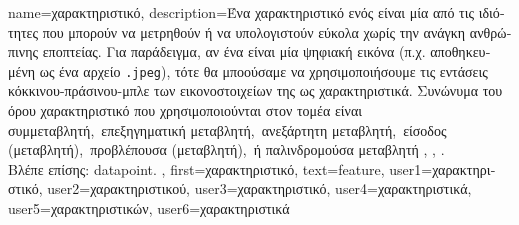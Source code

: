 {name={\foreignlanguage{greek}{χαρακτηριστικό}},
	description={\foreignlanguage{greek}{Ένα χαρακτηριστικό ενός} 
		 \foreignlanguage{greek}{είναι μία από τις ιδιότητες που μπορούν να μετρηθούν  
		ή να υπολογιστούν εύκολα χωρίς την ανάγκη ανθρώπινης εποπτείας. Για παράδειγμα, αν ένα}  
		\foreignlanguage{greek}{είναι μία ψηφιακή εικόνα (π.χ. αποθηκευμένη ως ένα αρχείο} \texttt{.jpeg}), 
		\foreignlanguage{greek}{τότε θα μποούσαμε να χρησιμοποιήσουμε τις εντάσεις κόκκινου-πράσινου-μπλε  
		των εικονοστοιχείων της ως χαρακτηριστικά. Συνώνυμα του όρου χαρακτηριστικό που χρησιμοποιούνται στον τομέα είναι 
		\guillemotleft συμμεταβλητή,\guillemotright\ \guillemotleft επεξηγηματική μεταβλητή,\guillemotright\ 
		\guillemotleft ανεξάρτητη μεταβλητή,\guillemotright\ \guillemotleft είσοδος (μεταβλητή),\guillemotright\ 
		\guillemotleft προβλέπουσα (μεταβλητή),\guillemotright\ ή 
		\guillemotleft παλινδρομούσα μεταβλητή\guillemotright} \cite{Gujarati2021}, \cite{Dodge2003}, \cite{Everitt2022}.\\
		\foreignlanguage{greek}{Βλέπε επίσης:} \gls{datapoint}. }, 
	first={\foreignlanguage{greek}{χαρακτηριστικό}},
	text={feature},
	user1={\foreignlanguage{greek}{χαρακτηριστικό}}, %
	user2={\foreignlanguage{greek}{χαρακτηριστικού}}, %
	user3={\foreignlanguage{greek}{χαρακτηριστικό}}, %
	user4={\foreignlanguage{greek}{χαρακτηριστικά}}, %
	user5={\foreignlanguage{greek}{χαρακτηριστικών}}, %
	user6={\foreignlanguage{greek}{χαρακτηριστικά}} %
}

